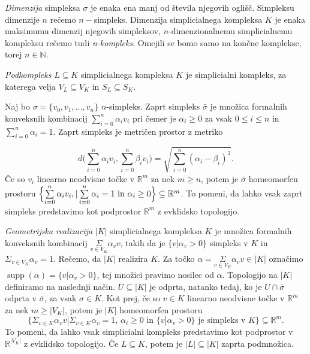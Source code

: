 \documentclass[mat1]{fmfdelo}
\DeclareRobustCommand{\si}{
    \bar{\sigma}}
\DeclareMathOperator*{\supp}{supp}
\newcommand{\R}{\mathbb R}
\newcommand{\N}{\mathbb N}
\begin{document}
\textit{Dimenzija} simpleksa $\sigma$ je enaka ena manj od števila njegovih oglišč. Simpleksu dimenzije $n$ rečemo $n-$simpleks. Dimenzija simplicialnega kompleksa $K$ je enaka maksimumu dimenzij njegovih simpleksov, $n$-dimenzionalnemu simplicialnemu kompleksu rečemo tudi \textit{n-kompleks}. Omejili se bomo samo na končne komplekse, torej $n \in \N$.


\textit{Podkompleks} $L\subseteq K$ simplicialnega kompleksa $K$ je simplicialni kompleks, za katerega velja $V_L\subseteq V_K$ in $S_L\subseteq S_K$.


 Naj bo $\sigma = \{v_0,v_1,\ldots,v_n\}$ $n$-simpleks. Zaprt
 simpleks $\bar{\sigma}$ je množica formalnih konveksnih kombinacij $\sum\limits_{i=0}^{n}\alpha_i v_i$
 pri čemer je $\alpha_i \ge 0$ za vsak $0\le i \le n$ in $\sum\limits_{i=0}^{n}\alpha_i = 1$. Zaprt simpleks je metričen prostor z metriko
 
 \begin{equation}
     d\biggl(\sum\limits_{i=0}^{n}\alpha_i v_i,\sum\limits_{i=0}^{n}\beta_i v_i \biggr) = \sqrt{\sum\limits_{i=0}^{n}(\alpha_i - \beta_i)^2}.
     \label{eq:metrika}    
 \end{equation}
 Če so $v_i$ linearno neodvisne točke v $\R^m$ za nek $m\geq n$, potem je $\bar{\sigma}$ homeomorfen prostoru 
 $\Bigl\{ \sum\limits_{i=0}^{n}\alpha_i v_i, | \sum\limits_{i=0}^{n}\alpha_i = 1 \text{ in } \alpha_i \ge 0 \Bigr\}\subseteq \R^m$. To pomeni, da lahko vsak zaprt simpleks predstavimo kot podprostor $\R^m$ z evklidsko topologijo.


 \textit{Geometrijska realizacija} $|K|$ simplicialnega kompleksa $K$ je 
 množica formalnih konveksnih kombinacij $\underset{v \in V_K}{\Sigma}\alpha_v v$, takih da je $\{v | \alpha_v > 0\}$ simpleks v $K$ in 
 $\Sigma_{v\in V_K}\alpha_v=1$. Rečemo, da $|K|$ realizira $K$. Za točko $\alpha=\underset{v \in V_K}{\Sigma}\alpha_v v \in |K|$ označimo $\supp(\alpha)=\{v | \alpha_v > 0\}$, 
 tej množici pravimo nosilec od $\alpha$. Topologijo na $|K|$ definiramo na naslednji način. $U \subseteq |K|$ je odprta, natanko tedaj, ko je $U \cap 
 \si$ odprta v $\si$, za vsak $\sigma \in K$. Kot prej, če so $v\in K$ linearno neodvisne točke v $\R^m$ za nek $m\geq |V_K|$, potem je 
 $|K|$ homeomorfen prostoru 
 $$\bigl\{\Sigma_{v\in K}\alpha_v v | \Sigma_{v\in K} \alpha_v = 1 \text{, } \alpha_i
 \ge 0 \text{ in } \{v | \alpha_v > 0\} \text{ je simpleks v $K$}\bigr\} \subseteq \R^m.$$ To pomeni, da lahko vsak simplicialni
 kompleks predstavimo kot podprostor v $\R^{|V_K|}$ z evklidsko topologijo.
 Če $L\subseteq K$, potem je $|L|\subseteq |K|$ zaprta podmnožica.
 
\end{document}
